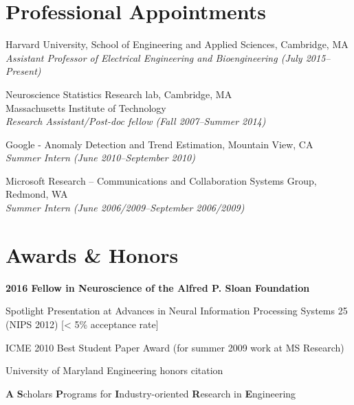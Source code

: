 \documentclass[12pt,letterpaper]{article}
\renewenvironment{itemize}{
  \begin{list}{}{
    \setlength{\leftmargin}{1.5em}
    \setlength{\itemsep}{0.25em}
    \setlength{\parskip}{0pt}
    \setlength{\parsep}{0.25em}
  }
}{
  \end{list}
}
\begin{document}
\section*{Professional Appointments}

\begin{itemize}
    \item Harvard University, School of Engineering and Applied Sciences, Cambridge, MA\\
          \emph{Assistant Professor of Electrical Engineering and Bioengineering (July 2015--Present)}

    \item Neuroscience Statistics Research lab, Cambridge, MA\\
          Massachusetts Institute of Technology \\
          \emph{Research Assistant/Post-doc fellow (Fall 2007--Summer 2014)}

    \item Google - Anomaly Detection and Trend Estimation, Mountain View, CA\\
          \emph{Summer Intern (June 2010--September 2010)}

    \item Microsoft Research -- Communications and Collaboration Systems Group, Redmond, WA\\
          \emph{Summer Intern (June 2006/2009--September 2006/2009)}
\end{itemize}

\section*{Awards \& Honors}

\begin{itemize}
	\item \textbf{2016 Fellow in Neuroscience of the Alfred P. Sloan Foundation}
    \item Spotlight Presentation at Advances in Neural Information Processing Systems 25 (NIPS 2012) [< 5\% acceptance rate]
    \item ICME 2010 Best Student Paper Award (for summer 2009 work at MS Research)
    \item University of Maryland Engineering honors citation
    \item \textbf{A} \textbf{S}cholars \textbf{P}rograms for \textbf{I}ndustry-oriented \textbf{R}esearch in \textbf{E}ngineering
\end{itemize}
\end{document}
